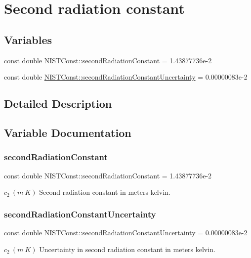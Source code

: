 \hypertarget{group___second_radiation_constant}{}\section{Second radiation constant}
\label{group___second_radiation_constant}
\subsection*{Variables}
\begin{DoxyCompactItemize}
\item 
const double \hyperlink{group___second_radiation_constant_ga40dfad662ee17ea208d271fa0977e69c}{N\+I\+S\+T\+Const\+::second\+Radiation\+Constant} = 1.\+43877736e-\/2
\item 
const double \hyperlink{group___second_radiation_constant_gac28d837ca8654ec72930d67641724af4}{N\+I\+S\+T\+Const\+::second\+Radiation\+Constant\+Uncertainty} = 0.\+00000083e-\/2
\end{DoxyCompactItemize}


\subsection{Detailed Description}


\subsection{Variable Documentation}
\mbox{\label{group___second_radiation_constant_ga40dfad662ee17ea208d271fa0977e69c}} 
\subsubsection{\texorpdfstring{second\+Radiation\+Constant}{secondRadiationConstant}}
{\footnotesize\ttfamily const double N\+I\+S\+T\+Const\+::second\+Radiation\+Constant = 1.\+43877736e-\/2}

$c_2 \ (m\ K)$ Second radiation constant in meters kelvin. \mbox{\label{group___second_radiation_constant_gac28d837ca8654ec72930d67641724af4}} 
\subsubsection{\texorpdfstring{second\+Radiation\+Constant\+Uncertainty}{secondRadiationConstantUncertainty}}
{\footnotesize\ttfamily const double N\+I\+S\+T\+Const\+::second\+Radiation\+Constant\+Uncertainty = 0.\+00000083e-\/2}

$c_2 \ (m\ K)$ Uncertainty in second radiation constant in meters kelvin. 